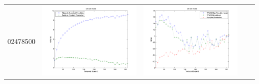 \documentclass[11pt]{article}
\begin{document}
\begin{table}[H]
{\begin{tabular}{c  c   c   c  c }
02478500&\begin{minipage}{.4\textwidth}\includegraphics[width=\linewidth]{resultgraph/02478500e.png}\end{minipage}
&\begin{minipage}{.4\textwidth}\includegraphics[width=\linewidth]{resultgraph/02478500MI.png}\end{minipage}

\end{tabular}}
\end{table}
\end{document}

